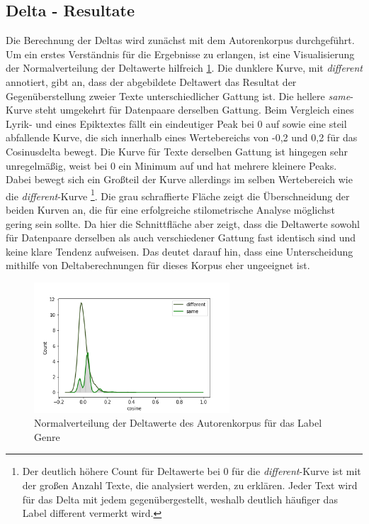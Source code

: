 \documentclass[a4paper,10p]{article}
\begin{document}
\subsection{Delta - Resultate}

Die Berechnung der Deltas wird zunächst mit dem Autorenkorpus durchgeführt. Um ein erstes Verständnis für die Ergebnisse zu erlangen, ist eine Visualisierung der Normalverteilung der Deltawerte hilfreich \ref{fig:normalverteilung_genre}. Die dunklere Kurve, mit \textit{different} annotiert, gibt an, dass der abgebildete Deltawert das Resultat der Gegenüberstellung zweier Texte unterschiedlicher Gattung ist. Die hellere \textit{same}-Kurve steht umgekehrt für Datenpaare derselben Gattung. Beim Vergleich eines Lyrik- und eines Epiktextes fällt ein eindeutiger Peak bei 0 auf sowie eine steil abfallende Kurve, die sich innerhalb eines Wertebereichs von -0,2 und 0,2 für das Cosinusdelta bewegt. Die Kurve für Texte derselben Gattung ist hingegen sehr unregelmäßig, weist bei 0 ein Minimum auf und hat mehrere kleinere Peaks. Dabei bewegt sich ein Großteil der Kurve allerdings im selben Wertebereich wie die \textit{different}-Kurve \footnote{Der deutlich höhere Count für Deltawerte bei 0 für die \textit{different}-Kurve ist mit der großen Anzahl Texte, die analysiert werden, zu erklären. Jeder Text wird für das Delta mit jedem gegenübergestellt, weshalb deutlich häufiger das Label \glqq different \grqq vermerkt wird.}. Die grau schraffierte Fläche zeigt die Überschneidung der beiden Kurven an, die für eine erfolgreiche stilometrische Analyse möglichst gering sein sollte. Da hier die Schnittfläche aber zeigt, dass die Deltawerte sowohl für Datenpaare derselben als auch verschiedener Gattung fast identisch sind und keine klare Tendenz aufweisen. Das deutet darauf hin, dass eine Unterscheidung mithilfe von Deltaberechnungen für dieses Korpus eher ungeeignet ist. \par 

\begin{figure}
	\includegraphics[width=0.65\textwidth]{autoren_delta_samedif_genre.png}
	\caption{Normalverteilung der Deltawerte des Autorenkorpus für das Label Genre}
	\label{fig:normalverteilung_genre}
	\end{figure}
		
\end{document}
